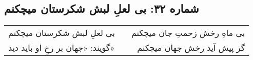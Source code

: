 \begin{center}
\section*{شماره ۳۲: بی لعلِ لبش شکرستان میچکنم}
\label{sec:032}
\begin{longtable}{l p{0.5cm} r}
بی لعلِ لبش شکرستان میچکنم
&&
بی ماهِ رخش زحمتِ جان میچکنم
\\
گویند: «جهان بر رخِ او باید دید»
&&
گر پیش آید رخش جهان میچکنم
\\
\end{longtable}
\end{center}
